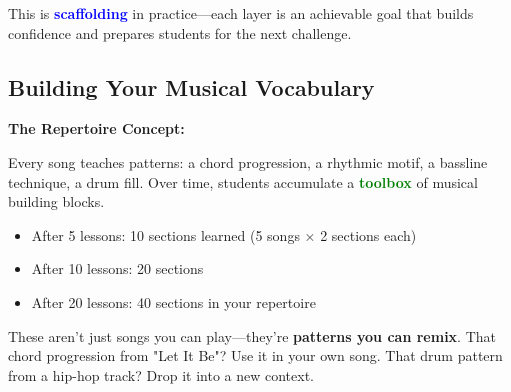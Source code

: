 \documentclass[11pt,letterpaper]{article}
\newcommand{\bluepurple}[1]{\textcolor{blue}{\textbf{#1}}}
\newcommand{\greentext}[1]{\textcolor{green}{\textbf{#1}}}
\begin{document}
This is \bluepurple{scaffolding} in practice—each layer is an achievable goal that builds confidence and prepares students for the next challenge.

\subsection*{Building Your Musical Vocabulary}

\begin{center}
\end{center}

\vspace{0.3cm}

\textbf{The Repertoire Concept:}

Every song teaches patterns: a chord progression, a rhythmic motif, a bassline technique, a drum fill. Over time, students accumulate a \greentext{toolbox} of musical building blocks.

\begin{itemize}[leftmargin=*]
\item After 5 lessons: 10 sections learned (5 songs × 2 sections each)
\item After 10 lessons: 20 sections
\item After 20 lessons: 40 sections in your repertoire
\end{itemize}

These aren't just songs you can play—they're \textbf{patterns you can remix}. That chord progression from "Let It Be"? Use it in your own song. That drum pattern from a hip-hop track? Drop it into a new context.
\end{document}
